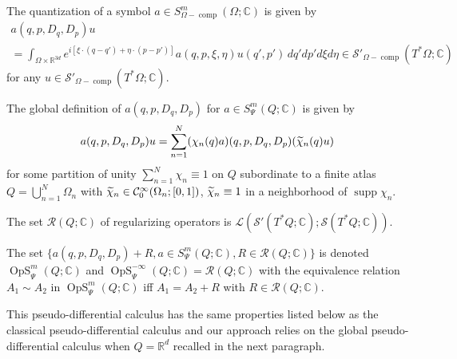 \documentclass[AHL,Unicode,longabstracts]{cedram}
\newcommand{\C}{\mathbb{C}}
\newcommand{\R}{\mathbb{R}}
\newcommand{\clC}{\mathcal{C}}
\newcommand{\clS}{\mathcal{S}}
\newcommand{\clL}{\mathcal{L}}
\newcommand{\clR}{\mathcal{R}}
\DeclareMathOperator{\OpS}{OpS}
\DeclareMathOperator{\ccomp}{comp}
\DeclareMathOperator{\suppp}{supp}
\let\oldtilde\tilde
\renewcommand*{\tilde}[1]{\mathchoice{\widetilde{#1}}{\widetilde{#1}}{\oldtilde{#1}}{\oldtilde{#1}}}
\begin{document}
\begin{defi}\label{def:quantiz}
The quantization of a symbol $a\in S^{m}_{\Omega-\ccomp}(\Omega;\C)$ is given by
\begin{multline*}
a(q,p,D_{q},D_{p})u\\
=\int_{\Omega\times \R^{3d}}e^{i[{\xi\cdot(q-q')+\eta\cdot(p-p')}]}a(q,p,\xi,\eta)u(q',p')\,dq'dp'd\xi d\eta
\in \clS'_{\Omega-\ccomp}(T^{*}\Omega;\C)
\end{multline*}
for any $u\in \clS'_{\Omega-\ccomp}(T^{*}\Omega;\C)$.

The global definition of $a(q,p,D_{q},D_{p})$ for $a\in S^{m}_{\Psi}(Q;\C)$ is given by
\begin{equation}\label{eq:quantchi}
a(q,p,D_{q},D_{p})u=\sum_{n=1}^{N}(\chi_{n}(q)a)(q,p,D_{q},D_{p}) (\tilde{\chi}_{n}(q)u)
\end{equation}
for some partition of unity $\sum_{n=1}^{N}\chi_{n}\equiv 1$ on $Q$ subordinate to a finite atlas $Q=\bigcup_{n=1}^{N}\Omega_{n}$ with $\tilde{\chi}_{n}\in \clC^{\infty}_{0}(\Omega_{n};[0,1])$, $\tilde{\chi}_{n}\equiv 1$ in a neighborhood of $\suppp\chi_{n}$.

The set $\clR(Q;\C)$ of regularizing operators is $ \clL(\clS'(T^{*}Q;\C);\clS(T^{*}Q;\C))$.

The set $\{a(q,p,D_{q},D_{p})+R , a\in S^{m}_{\Psi}(Q;\C) , R\in \clR(Q;\C)\}$ is denoted $\OpS^{m}_{\Psi}(Q;\C)$ and $\OpS^{-\infty}_{\Psi}(Q;\C)=\clR(Q;\C)$ with the equivalence relation $A_{1}\sim A_{2}$ in $\OpS^{m}_{\Psi}(Q;\C)$ iff $A_{1}=A_{2}+R$ with $R\in \clR(Q;\C)$.
\end{defi}

This pseudo-differential calculus has the same properties listed below as the classical pseudo-differential calculus and our approach relies on the global pseudo-differential calculus when $Q=\R^{d}$ recalled in the next paragraph.
\end{document}

